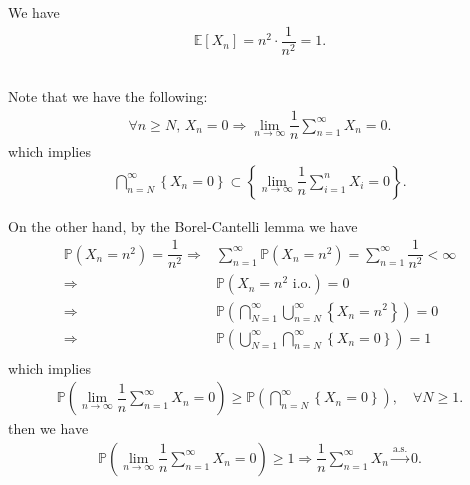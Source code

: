 \documentclass[11pt,a4paper]{article}
\numberwithin{equation}{section}%
\begin{document}
\subsection{}

We have
\begin{align*}
    \mathbb{E}\left[ X_n \right] = n^2\cdot \dfrac{ 1 }{ n^2 } =1.  
\end{align*}


\subsection{}
Note that we have the following:
\begin{align*}
    \forall n\geq N,\, X_n = 0 \Rightarrow \lim_{n\to\infty} \dfrac{ 1 }{ n }\sum_{n=1}^\infty X_n = 0. 
\end{align*}
which implies
\begin{align*}
    \bigcap_{n=N}^\infty \left\{ X_n = 0 \right\} \subset \left\{ \lim_{n\to\infty} \dfrac{ 1 }{ n }\sum_{i=1}^n X_i = 0 \right\}. 
\end{align*}

On the other hand, by the Borel-Cantelli lemma we have
\begin{align*}
    \mathbb{P}\left( X_n = n^2 \right) = \dfrac{ 1 }{ n^2 }  \Rightarrow &\sum_{n=1}^\infty \mathbb{P}\left( X_n = n^2 \right) = \sum_{n=1}^\infty \dfrac{ 1 }{ n^2 } <\infty \\
     \Rightarrow &\mathbb{P}\left( X_n = n^2 \text{ i.o.} \right) = 0\\
        \Rightarrow &\mathbb{P}\left( \bigcap_{N=1}^\infty \bigcup_{n=N}^\infty \left\{ X_n = n^2 \right\} \right) = 0\\
        \Rightarrow &\mathbb{P}\left( \bigcup_{N=1}^\infty \bigcap_{n=N}^\infty \left\{ X_n = 0\right\} \right) = 1\\
\end{align*}
which implies
\begin{align*}
    \mathbb{P}\left( \lim_{n\to\infty} \dfrac{ 1 }{ n }\sum_{n=1}^\infty X_n =0 \right)  \geq \mathbb{P}\left( \bigcap_{n=N}^\infty \left\{ X_n = 0\right\} \right),\quad \forall N\geq 1.
\end{align*}
then we have
\begin{align*}
    \mathbb{P}\left( \lim_{n\to\infty} \dfrac{ 1 }{ n }\sum_{n=1}^\infty X_n =0 \right) \geq 1 \Rightarrow  \dfrac{ 1 }{ n }\sum_{n=1}^\infty X_n \xrightarrow[]{\mathrm{a.s.}} 0.
\end{align*}
\end{document}
